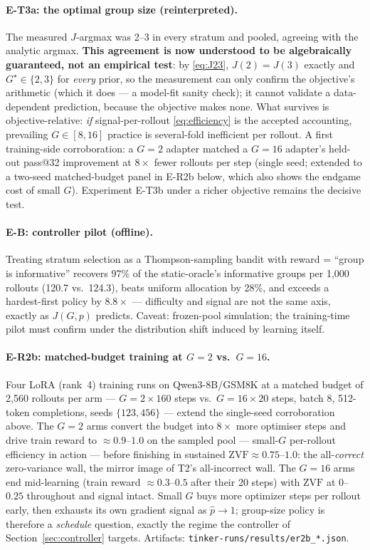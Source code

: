 \documentclass[11pt]{article}
\theoremstyle{plain}
\theoremstyle{definition}
\theoremstyle{remark}
\newcommand{\ZVF}{\ensuremath{\mathrm{ZVF}}}
\newcommand{\1}{\mathbb{1}}
\begin{document}
\paragraph{E-T3a: the optimal group size (reinterpreted).} The measured
$J$-argmax was 2--3 in every stratum and pooled, agreeing with the
analytic argmax. \textbf{This agreement is now understood to be
algebraically guaranteed, not an empirical test}: by \eqref{eq:J23},
$J(2)=J(3)$ exactly and $G^\star\in\{2,3\}$ for \emph{every} prior, so
the measurement can only confirm the objective's arithmetic (which it
does --- a model-fit sanity check); it cannot validate a data-dependent
prediction, because the objective makes none. What survives is
objective-relative: \emph{if} signal-per-rollout \eqref{eq:efficiency}
is the accepted accounting, prevailing $G\in[8,16]$ practice is
several-fold inefficient per rollout. A first training-side
corroboration: a $G{=}2$ adapter matched a $G{=}16$ adapter's held-out
pass@32 improvement at $8\times$ fewer rollouts per step (single seed;
extended to a two-seed matched-budget panel in E-R2b below, which also
shows the endgame cost of small $G$). Experiment E-T3b under a richer
objective remains the decisive test.

\paragraph{E-B: controller pilot (offline).} Treating stratum selection as
a Thompson-sampling bandit with reward = ``group is informative'' recovers
97\% of the static-oracle's informative groups per 1{,}000 rollouts
(120.7 vs.\ 124.3), beats uniform allocation by 28\%, and exceeds a
hardest-first policy by $8.8\times$ --- difficulty and signal are not the
same axis, exactly as $J(G,p)$ predicts. Caveat: frozen-pool simulation;
the training-time pilot must confirm under the distribution shift induced
by learning itself.

\paragraph{E-R2b: matched-budget training at $G{=}2$ vs.\ $G{=}16$.} Four
LoRA (rank~4) training runs on Qwen3-8B/GSM8K at a matched budget of
2{,}560 rollouts per arm --- $G{=}2\times160$ steps vs.\ $G{=}16\times20$
steps, batch 8, 512-token completions, seeds $\{123,456\}$ --- extend the
single-seed corroboration above. The $G{=}2$ arms convert the budget into
$8\times$ more optimiser steps and drive train reward to
$\approx0.9$--$1.0$ on the sampled pool --- small-$G$ per-rollout
efficiency in action --- before finishing in sustained
$\ZVF\approx0.75$--$1.0$: the all-\emph{correct} zero-variance wall, the
mirror image of T2's all-incorrect wall. The $G{=}16$ arms end
mid-learning (train reward $\approx0.3$--$0.5$ after their 20 steps) with
$\ZVF$ at $0$--$0.25$ throughout and signal intact. Small $G$ buys more optimizer steps per rollout early, then
exhausts its own gradient signal as $\hat p\to 1$; group-size policy is
therefore a \emph{schedule} question, exactly the regime the controller of
Section~\ref{sec:controller} targets. Artifacts:
\texttt{tinker-runs/results/er2b\_*.json}.
\end{document}
